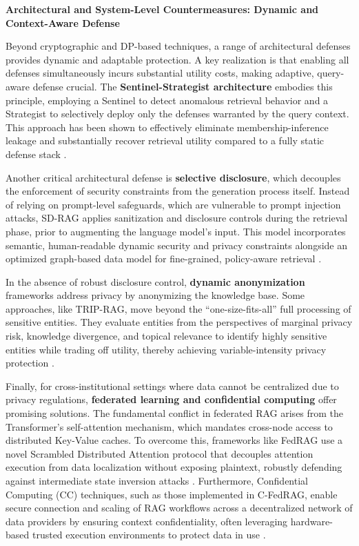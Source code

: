 \documentclass[11pt]{article}
\begin{document}
\textbf{Architectural and System-Level Countermeasures: Dynamic and Context-Aware Defense}

Beyond cryptographic and DP-based techniques, a range of architectural defenses provides dynamic and adaptable protection. A key realization is that enabling all defenses simultaneously incurs substantial utility costs, making adaptive, query-aware defense crucial. The \textbf{Sentinel-Strategist architecture} embodies this principle, employing a Sentinel to detect anomalous retrieval behavior and a Strategist to selectively deploy only the defenses warranted by the query context. This approach has been shown to effectively eliminate membership-inference leakage and substantially recover retrieval utility compared to a fully static defense stack \cite{ref457}.

Another critical architectural defense is \textbf{selective disclosure}, which decouples the enforcement of security constraints from the generation process itself. Instead of relying on prompt-level safeguards, which are vulnerable to prompt injection attacks, SD-RAG applies sanitization and disclosure controls during the retrieval phase, prior to augmenting the language model's input. This model incorporates semantic, human-readable dynamic security and privacy constraints alongside an optimized graph-based data model for fine-grained, policy-aware retrieval \cite{ref495}.

In the absence of robust disclosure control, \textbf{dynamic anonymization} frameworks address privacy by anonymizing the knowledge base. Some approaches, like TRIP-RAG, move beyond the ``one-size-fits-all'' full processing of sensitive entities. They evaluate entities from the perspectives of marginal privacy risk, knowledge divergence, and topical relevance to identify highly sensitive entities while trading off utility, thereby achieving variable-intensity privacy protection \cite{ref496}.

Finally, for cross-institutional settings where data cannot be centralized due to privacy regulations, \textbf{federated learning and confidential computing} offer promising solutions. The fundamental conflict in federated RAG arises from the Transformer's self-attention mechanism, which mandates cross-node access to distributed Key-Value caches. To overcome this, frameworks like FedRAG use a novel Scrambled Distributed Attention protocol that decouples attention execution from data localization without exposing plaintext, robustly defending against intermediate state inversion attacks \cite{ref497}. Furthermore, Confidential Computing (CC) techniques, such as those implemented in C-FedRAG, enable secure connection and scaling of RAG workflows across a decentralized network of data providers by ensuring context confidentiality, often leveraging hardware-based trusted execution environments to protect data in use \cite{ref498}.
\end{document}
